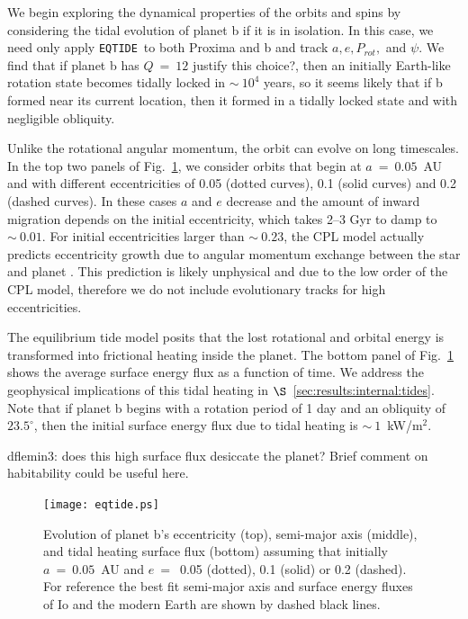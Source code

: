 \documentclass[preprint,12pt]{aastex}
\newcommand{\xxx}[1]{{\color{red} #1}} %
\def\eqtide{\texttt{\footnotesize{EQTIDE}}\xspace}
\begin{document}
We begin exploring the dynamical properties of the orbits and spins by
considering the tidal evolution of planet b if it is in isolation. In
this case, we need only apply \eqtide~to both Proxima and b and track
$a, e, P_{rot},$ and $\psi$. We find that if planet b has $Q~=~12$ \xxx{justify this choice?},
then an initially Earth-like rotation state becomes tidally locked in
$\sim~10^4$ years, so it seems likely that if b formed near its
current location, then it formed in a tidally locked state and with
negligible obliquity.

Unlike the rotational angular momentum, the orbit can evolve on long
timescales. In the top two panels of Fig.~\ref{fig:eqtide}, we
consider orbits that begin at $a~=~0.05$~AU and with different
eccentricities of 0.05 (dotted curves), 0.1 (solid curves) and 0.2
(dashed curves). In these cases $a$ and $e$ decrease and the amount of
inward migration depends on the initial eccentricity, which takes 2--3
Gyr to damp to $\sim~0.01$. For initial eccentricities larger than
$\sim~0.23$, the CPL model actually predicts eccentricity growth due
to angular momentum exchange between the star and planet
\citep{Barnes16}. This prediction is likely unphysical and due to the
low order of the CPL model, therefore we do not include evolutionary
tracks for high eccentricities.

The equilibrium tide model posits that the lost rotational and orbital
energy is transformed into frictional heating inside the planet. The
bottom panel of Fig.~\ref{fig:eqtide} shows the average surface energy
flux as a function of time. We address the geophysical implications of
this tidal heating in $\S$~\ref{sec:results:internal:tides}. Note that if planet
b begins with a rotation period of 1 day and an obliquity of
$23.5^\circ$, then the initial surface energy flux due to tidal
heating is $\sim~1$~kW/m$^{2}$.

\xxx{dflemin3: does this high surface flux desiccate the planet?  Brief comment on habitability could be useful here.}

\begin{figure} 
\begin{center}
\texttt{[image: eqtide.ps]}
\end{center}
\caption{Evolution of planet b's eccentricity (top), semi-major axis
  (middle), and tidal heating surface flux (bottom) assuming that
  initially $a~=~0.05$~AU and $e~=$~0.05 (dotted), 0.1 (solid) or 0.2
  (dashed). For reference the best fit semi-major axis and surface
  energy fluxes of Io and the modern Earth are shown by dashed black
  lines.}
\label{fig:eqtide}
\end{figure}
\end{document}
